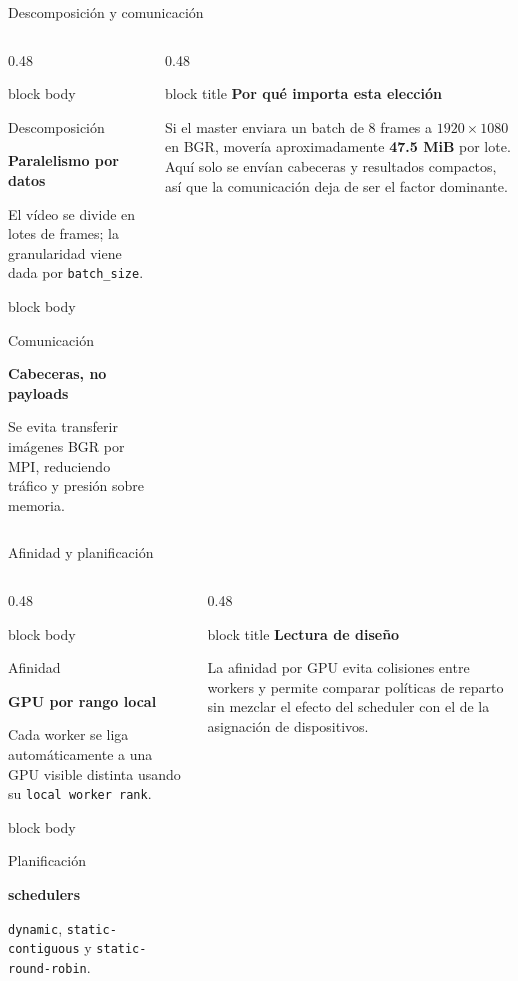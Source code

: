 \documentclass[aspectratio=169,11pt]{beamer}
\newcommand{\metriccard}[3]{
  \begin{beamercolorbox}[wd=\linewidth,sep=0.65em,rounded=true,shadow=false]{block body}
    {\small\color{GraphGray}#1\par}
    \vspace{0.1em}
    {\bfseries\fontsize{16}{18}\selectfont #2\par}
    \vspace{0.1em}
    {\footnotesize #3\par}
  \end{beamercolorbox}
}
\newcommand{\callout}[2]{
  \begin{beamercolorbox}[wd=\linewidth,sep=0.6em,rounded=true,shadow=false]{block title}
    {\bfseries #1}\par
    \vspace{0.15em}
    {\footnotesize #2}
  \end{beamercolorbox}
}
\begin{document}
\begin{frame}{Descomposición y comunicación}
  \small
  \begin{columns}[T,totalwidth=\textwidth]
    \begin{column}{0.48\textwidth}
      \metriccard{Descomposición}{Paralelismo por datos}{El vídeo se divide en lotes de frames; la granularidad viene dada por \texttt{batch\_size}.}
      \vspace{0.25em}
      \metriccard{Comunicación}{Cabeceras, no payloads}{Se evita transferir imágenes BGR por MPI, reduciendo tráfico y presión sobre memoria.}
    \end{column}
    \begin{column}{0.48\textwidth}
      \callout{Por qué importa esta elección}{
        Si el master enviara un batch de 8 frames a \(1920\times1080\) en BGR, movería aproximadamente \textbf{47.5 MiB} por lote. Aquí solo se envían cabeceras y resultados compactos, así que la comunicación deja de ser el factor dominante.}
    \end{column}
  \end{columns}
\end{frame}

\begin{frame}{Afinidad y planificación}
  \small
  \begin{columns}[T,totalwidth=\textwidth]
    \begin{column}{0.48\textwidth}
      \metriccard{Afinidad}{GPU por rango local}{Cada worker se liga automáticamente a una GPU visible distinta usando su \texttt{local worker rank}.}
      \vspace{0.25em}
      \metriccard{Planificación}{3 schedulers}{\texttt{dynamic}, \texttt{static-contiguous} y \texttt{static-round-robin}.}
    \end{column}
    \begin{column}{0.48\textwidth}
      \callout{Lectura de diseño}{
        La afinidad por GPU evita colisiones entre workers y permite comparar políticas de reparto sin mezclar el efecto del scheduler con el de la asignación de dispositivos.}
    \end{column}
  \end{columns}
\end{frame}
\end{document}

